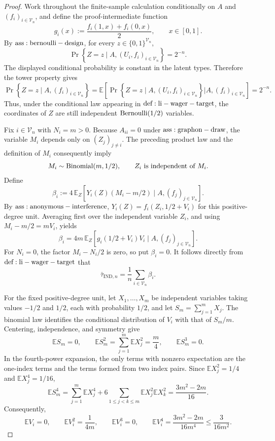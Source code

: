 \documentclass{article}
\begin{document}
\begin{proof}
Work throughout the finite-sample calculation conditionally on \(A\) and \((f_i)_{i\in\mathcal V_n}\), and define the proof-intermediate function
\[
 g_i(x):=\frac{f_i(1,x)+f_i(0,x)}2,
 \qquad x\in[0,1].
\]
By \({\rm ass:bernoulli-design}\), for every \(z\in\{0,1\}^{\mathcal V_n}\),
\[
 \Pr\!\left\{Z=z\mid A,(U_i,f_i)_{i\in\mathcal V_n}\right\}=2^{-n}.
\]
The displayed conditional probability is constant in the latent types.  Therefore the tower property gives
\[
 \Pr\!\left\{Z=z\mid A,(f_i)_{i\in\mathcal V_n}\right\}
 =\mathbb E\!\left[
   \Pr\!\left\{Z=z\mid A,(U_i,f_i)_{i\in\mathcal V_n}\right\}
   \mathrel{\big|}A,(f_i)_{i\in\mathcal V_n}
 \right]
 =2^{-n}.
\]
Thus, under the conditional law appearing in \({\rm def:li-wager-target}\), the coordinates of \(Z\) are still independent \({\rm Bernoulli}(1/2)\) variables.

Fix \(i\in\mathcal V_n\) with \(N_i=m>0\).  Because \(A_{ii}=0\) under \({\rm ass:graphon-draw}\), the variable \(M_i\) depends only on \((Z_j)_{j\ne i}\).  The preceding product law and the definition of \(M_i\) consequently imply
\[
 M_i\sim {\rm Binomial}(m,1/2),
 \qquad Z_i\ \hbox{is independent of }M_i.
\]
Define
\[
 \beta_i:=4\,\mathbb E_Z\!\left[
 Y_i(Z)(M_i-m/2)\mid A,(f_j)_{j\in\mathcal V_n}
 \right].
\]
By \({\rm ass:anonymous-interference}\), \(Y_i(Z)=f_i(Z_i,1/2+V_i)\) for this positive-degree unit.  Averaging first over the independent variable \(Z_i\), and using \(M_i-m/2=mV_i\), yields
\[
 \beta_i
 =4m\,\mathbb E_Z\!\left[
 g_i(1/2+V_i)V_i\mid A,(f_j)_{j\in\mathcal V_n}
 \right].
\]
For \(N_i=0\), the factor \(M_i-N_i/2\) is zero, so put \(\beta_i=0\).  It follows directly from \({\rm def:li-wager-target}\) that
\[
 \bar\tau_{\mathrm{IND},n}=\frac1n\sum_{i\in\mathcal V_n}\beta_i.
\]

For the fixed positive-degree unit, let \(X_1,\ldots,X_m\) be independent variables taking values \(-1/2\) and \(1/2\), each with probability \(1/2\), and let \(S_m=\sum_{j=1}^mX_j\).  The binomial law identifies the conditional distribution of \(V_i\) with that of \(S_m/m\).  Centering, independence, and symmetry give
\[
 \mathbb E S_m=0,
 \qquad
 \mathbb E S_m^2=\sum_{j=1}^m\mathbb E X_j^2=\frac m4,
 \qquad
 \mathbb E S_m^3=0.
\]
In the fourth-power expansion, the only terms with nonzero expectation are the one-index terms and the terms formed from two index pairs.  Since \(\mathbb E X_j^2=1/4\) and \(\mathbb E X_j^4=1/16\),
\[
 \mathbb E S_m^4
 =\sum_{j=1}^m\mathbb E X_j^4
  +6\sum_{1\le j<k\le m}\mathbb E X_j^2\mathbb E X_k^2
 =\frac{3m^2-2m}{16}.
\]
Consequently,
\[
 \mathbb E V_i=0,
 \qquad
 \mathbb E V_i^2=\frac1{4m},
 \qquad
 \mathbb E V_i^3=0,
 \qquad
 \mathbb E V_i^4=\frac{3m^2-2m}{16m^4}\le\frac3{16m^2}.
\]


\end{proof}
\end{document}
